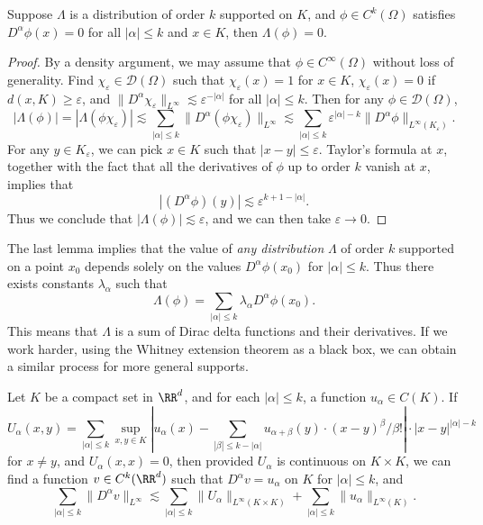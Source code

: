 \begin{lemma}
    Suppose $\Lambda$ is a distribution of order $k$ supported on $K$, and $\phi \in C^k(\Omega)$ satisfies $D^\alpha \phi(x) = 0$ for all $|\alpha| \leq k$ and $x \in K$, then $\Lambda(\phi) = 0$.
\end{lemma}
\begin{proof}
    By a density argument, we may assume that $\phi \in C^\infty(\Omega)$ without loss of generality. Find $\chi_\varepsilon \in \mathcal{D}(\Omega)$ such that $\chi_\varepsilon(x) = 1$ for $x \in K$, $\chi_\varepsilon(x) = 0$ if $d(x,K) \geq \varepsilon$, and $\| D^\alpha \chi_\varepsilon \|_{L^\infty} \lesssim \varepsilon^{-|\alpha|}$ for all $|\alpha| \leq k$. Then for any $\phi \in \mathcal{D}(\Omega)$,
    \[ |\Lambda(\phi)| = |\Lambda(\phi \chi_\varepsilon)| \lesssim \sum_{|\alpha| \leq k} \| D^\alpha(\phi \chi_\varepsilon) \|_{L^\infty} \lesssim \sum_{|\alpha| \leq k} \varepsilon^{|\alpha|-k} \| D^\alpha \phi \|_{L^\infty(K_\varepsilon)}. \]
    For any $y \in K_\varepsilon$, we can pick $x \in K$ such that $|x - y| \leq \varepsilon$. Taylor's formula at $x$, together with the fact that all the derivatives of $\phi$ up to order $k$ vanish at $x$, implies that
    \[ |(D^\alpha \phi)(y)| \lesssim \varepsilon^{k+1 - |\alpha|}. \]
    Thus we conclude that $|\Lambda(\phi)| \lesssim \varepsilon$, and we can then take $\varepsilon \to 0$.
\end{proof}

The last lemma implies that the value of \emph{any distribution} $\Lambda$ of order $k$ supported on a point $x_0$ depends solely on the values $D^\alpha \phi(x_0)$ for $|\alpha| \leq k$. Thus there exists constants $\lambda_\alpha$ such that
%
\[ \Lambda(\phi) = \sum_{|\alpha| \leq k} \lambda_\alpha D^\alpha \phi(x_0). \]
%
This means that $\Lambda$ is a sum of Dirac delta functions and their derivatives. If we work harder, using the Whitney extension theorem as a black box, we can obtain a similar process for more general supports.

\begin{theorem}[Whitney]
    Let $K$ be a compact set in $\RR^d$, and for each $|\alpha| \leq k$, a function $u_\alpha \in C(K)$. If
    \[ U_\alpha(x,y) = \sum_{|\alpha| \leq k} \sup_{x,y \in K} \left| u_\alpha(x) - \sum_{|\beta| \leq k - |\alpha|} u_{\alpha + \beta}(y) \cdot (x - y)^\beta / \beta! \right| \cdot |x - y|^{|\alpha| - k}  \]
    for $x \neq y$, and $U_\alpha(x,x) = 0$, then provided $U_\alpha$ is continuous on $K \times K$, we can find a function $v \in C^k(\RR^d)$ such that $D^\alpha v = u_\alpha$ on $K$ for $|\alpha| \leq k$, and
    \[ \sum_{|\alpha| \leq k} \| D^\alpha v \|_{L^\infty} \lesssim \sum_{|\alpha| \leq k} \| U_\alpha \|_{L^\infty(K \times K)} + \sum_{|\alpha| \leq k} \| u_\alpha \|_{L^\infty(K)}. \]
\end{theorem}


